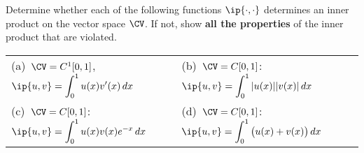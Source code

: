 Determine whether each of the following functions $\ip{\cdot,\cdot}$ 
determines an inner product on the vector space $\CV$.  
If not, show \textbf{all the properties} 
of the inner product that are violated.

\begin{center}\begin{tabular}{ll}
 (a)\ $\CV = C^1[0,1]$, $\displaystyle{\ip{u,v} = \int_0^1 u(x) v'(x)\, dx}$ & 
 (b)\ $\CV = C[0,1]$: $\displaystyle{\ip{u,v} = \int_0^1 |u(x)| |v(x)|\, dx}$ \ \ \ \ \ \\[0.75em]
 (c)\ $\CV = C[0,1]$: $\displaystyle{\ip{u,v} = \int_0^1 u(x) v(x) e^{-x}\, dx}$ & 
 (d)\ $\CV = C[0,1]$: $\displaystyle{\ip{u,v} = \int_0^1 \big(u(x) + v(x)\big)\, dx}$ \\
\end{tabular}\end{center}


